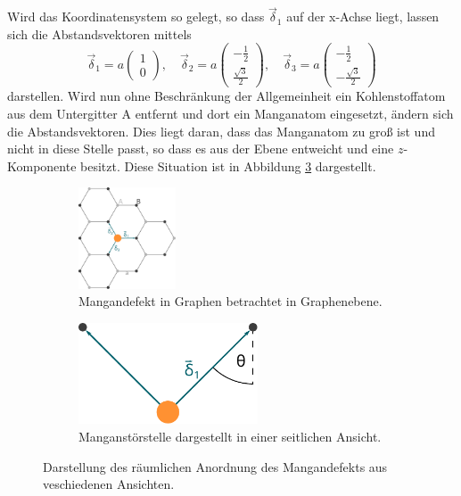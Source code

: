Wird das Koordinatensystem so gelegt, so dass $\vec{\delta}_1$ auf der x-Achse liegt, lassen sich die Abstandsvektoren mittels
\begin{equation*}
    \vec{\delta}_1 = a \begin{pmatrix} 1            \\[4pt] 0                   \end{pmatrix}, \quad
    \vec{\delta}_2 = a \begin{pmatrix} -\frac{1}{2} \\[4pt] \frac{\sqrt{3}}{2}  \end{pmatrix}, \quad 
    \vec{\delta}_3 = a \begin{pmatrix} -\frac{1}{2} \\[4pt] -\frac{\sqrt{3}}{2} \end{pmatrix}
\end{equation*}
darstellen.
Wird nun ohne Beschränkung der Allgemeinheit ein Kohlenstoffatom aus dem Untergitter A entfernt und dort ein Manganatom eingesetzt, ändern sich die
Abstandsvektoren. 
Dies liegt daran, dass das Manganatom zu groß ist und nicht in diese Stelle passt, so dass es aus der Ebene entweicht und eine $z$-Komponente besitzt.
Diese Situation ist in Abbildung \ref{fig:mangan_impurity} dargestellt.
\begin{figure}
    \begin{subfigure}{0.48\textwidth}%
    \centering%
    \includegraphics[height=3cm]{Plots/mangan_impurity_inplane.pdf}%
    \caption{Mangandefekt in Graphen betrachtet in Graphenebene.}%
    \label{fig:mangan_impurity_inplane}%
    \end{subfigure}%
    \hfill%
    \begin{subfigure}{0.48\textwidth}%
    \centering%
    \includegraphics[height=3cm]{Plots/mangan_impurity_z_component.pdf}%
    \caption{Manganstörstelle dargestellt in einer seitlichen Ansicht.}%
    \label{fig:mangan_impurity_z_component}%
    \end{subfigure}%
    \caption{Darstellung des räumlichen Anordnung des Mangandefekts aus veschiedenen Ansichten.}%
    \label{fig:mangan_impurity}%
\end{figure}%
